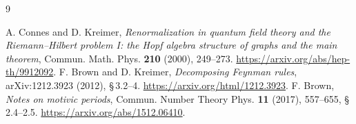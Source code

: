 \documentclass[11pt,a4paper]{ctexart}
\theoremstyle{cnplain}
\theoremstyle{remark}\newtheorem{remark}[theorem]{注}
\begin{document}
\begin{thebibliography}{9}\small\raggedright
{} A. Connes and D. Kreimer,
\emph{Renormalization in quantum field theory and the Riemann--Hilbert problem I:
the Hopf algebra structure of graphs and the main theorem},
Commun. Math. Phys. \textbf{210} (2000), 249--273.
\url{https://arxiv.org/abs/hep-th/9912092}.
 F. Brown and D. Kreimer,
\emph{Decomposing Feynman rules}, arXiv:1212.3923 (2012), \S\,3.2--4.
\url{https://arxiv.org/html/1212.3923}.
 F. Brown, \emph{Notes on motivic periods},
Commun. Number Theory Phys. \textbf{11} (2017), 557--655, \S\,2.4--2.5.
\url{https://arxiv.org/abs/1512.06410}.
\end{thebibliography}
\end{document}
